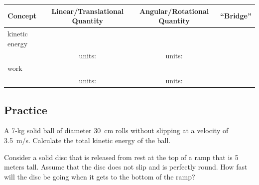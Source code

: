 \documentclass[10pt]{exam}
\begin{document}
\renewcommand{\arraystretch}{2}

\begin{tabular}{p{9em}ccp{6.5em}}
  Concept & Linear/Translational Quantity & Angular/Rotational Quantity & \hfill ``Bridge'' \\ \hline\hline
  kinetic energy \\[1em] & units: & units:  \\\hline
  work \\[1em] & units: & units:  \\\hline
\end{tabular}

\pagebreak


\subsection*{Practice}

\begin{questions}
  \question
    A 7-kg solid ball of diameter 30~cm rolls without slipping at a velocity of 3.5~m/s.  Calculate the total kinetic energy of the ball.
  
  \vs

  \question
    Consider a solid disc that is released from rest at the top of a ramp that is 5 meters tall. Assume that the disc does not slip and is perfectly round. How fast will the disc be going when it gets to the bottom of the ramp?
  
  \vs[2]
  
  



  
  
  
  

\end{questions}
\end{document}
